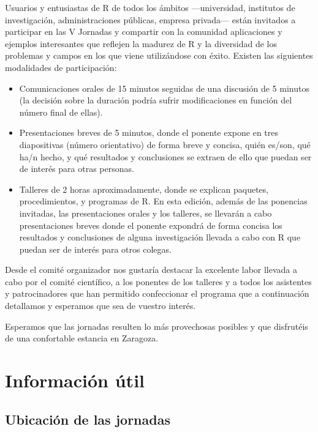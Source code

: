 Usuarios y entusiastas de R de todos los ámbitos —universidad,
institutos de investigación, administraciones públicas, empresa
privada— están invitados a participar en las V Jornadas y compartir
con la comunidad aplicaciones y ejemplos interesantes que reflejen la
madurez de R y la diversidad de los problemas y campos en los que
viene utilizándose con éxito. Existen las siguientes modalidades de
participación:
\begin{itemize}
\item Comunicaciones orales de 15 minutos seguidas de una discusión de
  5 minutos (la decisión sobre la duración podría sufrir
  modificaciones en función del número final de ellas).

\item Presentaciones breves de 5 minutos, donde el ponente expone en
  tres diapositivas (número orientativo) de forma breve y concisa,
  quién es/son, qué ha/n hecho, y qué resultados y conclusiones se
  extraen de ello que puedan ser de interés para otras personas.

\item Talleres de 2 horas aproximadamente, donde se explican paquetes,
  procedimientos, y programas de R.  En esta edición, además de las
  ponencias invitadas, las presentaciones orales y los talleres, se
  llevarán a cabo presentaciones breves donde el ponente expondrá de
  forma concisa los resultados y conclusiones de alguna investigación
  llevada a cabo con R que puedan ser de interés para otros colegas.
\end{itemize}

Desde el comité organizador nos gustaría destacar la excelente labor
llevada a cabo por el comité científico, a los ponentes de los
talleres y a todos los asistentes y patrocinadores que han permitido 
confeccionar el programa que a continuación detallamos y esperamos que 
sea de vuestro interés.

Esperamos que las jornadas resulten lo más provechosas posibles y que
disfrutéis de una confortable estancia en Zaragoza.


\chapter{Información útil}

\section{Ubicación de las jornadas}

